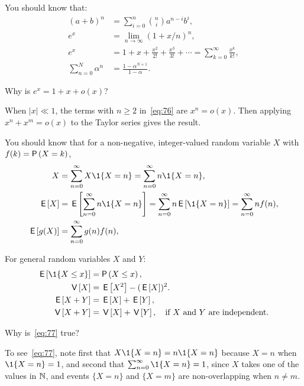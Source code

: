 You should know that:
\begin{subequations}
 \begin{align}
 (a+b)^n &= \sum_{i=0}^n {n \choose i} a^{n-i} b^i, \label{eq:71}\\
e^x &= \lim_{n\to\infty} (1+x/n)^n, \label{eq:65}\\
 e^x &= 1 + x + \frac{x^2}{2!} + \frac{x^3}{3!} + \cdots = \sum_{k=0}^{\infty} \frac{x^k}{k!}, \label{eq:76}\\
 \sum_{n=0}^N \alpha^n &= \frac{1-\alpha^{N+1}}{1-\alpha}. \label{eq:61}
\end{align}
\end{subequations}

\begin{extra}
 Why is $e^{x} = 1 +x + o(x)$?
\begin{solution}
 When $|x|\ll 1$, the terms with $n\geq 2$ in~\cref{eq:76} are $x^n = o(x)$. Then applying $x^n + x^m = o(x)$ to the Taylor series gives the result.
\end{solution}
\end{extra}


You should know that for a non-negative, integer-valued random variable $X$ with  $f(k)= \P{X = k}$, 
\begin{subequations}\label{eq:105}
\begin{align}
X&=\sum_{n=0}^\infty X\1{X=n} = \sum_{n=0}^\infty n \1{X=n}, \label{eq:77} \\
\E X &= \E{\sum_{n=0}^\infty n \1{X=n}} = \sum_{n=0}^\infty n \E{\1{X=n}} = \sum_{n=0}^\infty n f(n), \label{eq:p-78} \\
  \E{g(X)} &= \sum_{n=0}^\infty g(n) f(n), \label{eq:66}
\end{align}             
\end{subequations}

For general random variables $X$ and $Y$:
\begin{align}
\E{\1{X\leq x}} &= \P{X\leq x}, \label{eq:74}\\
  \V X &= \E{X^2} - (\E X)^2.\label{eq:68}\\
  \E{X+Y} &= \E X + \E Y, \label{eq:95}\\
  \V{X+Y} &= \V X + \V Y, \quad\text{if $X$ and $Y$ are independent.}\label{eq:94}
\end{align}

\begin{extra}
 Why is~\cref{eq:77} true?
\begin{solution}
To see~\cref{eq:77}, note first that $X\1{X=n} = n\1{X=n}$ because $X=n$ when $\1{X=n} =1$, and second that $\sum_{n=0}^\infty \1{X=n} =1$, since $X$ takes one of the values in $\mathbb{N}$, and events $\{X=n\}$ and $\{X=m\}$ are non-overlapping when $n\neq m$. 
\end{solution}
\end{extra}

